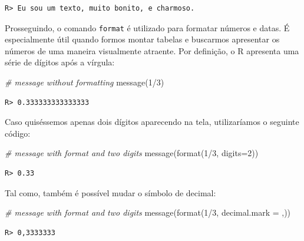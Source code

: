 \documentclass[
  11pt,
]{book}
\newenvironment{Shaded}{\begin{snugshade}}{\end{snugshade}}
\newcommand{\AttributeTok}[1]{\textcolor[rgb]{0.61,0.61,0.61}{#1}}
\newcommand{\CommentTok}[1]{\textcolor[rgb]{0.37,0.37,0.37}{\textit{#1}}}
\newcommand{\DecValTok}[1]{\textcolor[rgb]{0.06,0.06,0.06}{#1}}
\newcommand{\FunctionTok}[1]{\textcolor[rgb]{0,0,0}{#1}}
\newcommand{\NormalTok}[1]{#1}
\newcommand{\SpecialCharTok}[1]{\textcolor[rgb]{0,0,0}{#1}}
\newcommand{\StringTok}[1]{\textcolor[rgb]{0.5,0.5,0.5}{#1}}
\begin{document}
\begin{verbatim}
R> Eu sou um texto, muito bonito, e charmoso.
\end{verbatim}

Prosseguindo, o comando \texttt{format} é utilizado para formatar números e datas. É especialmente útil quando formos montar tabelas e buscarmos apresentar os números de uma maneira visualmente atraente. Por definição, o R apresenta uma série de dígitos após a vírgula:

\begin{Shaded}
\begin{Highlighting}[]
\CommentTok{\# message without formatting}
\FunctionTok{message}\NormalTok{(}\DecValTok{1}\SpecialCharTok{/}\DecValTok{3}\NormalTok{)}
\end{Highlighting}
\end{Shaded}

\begin{verbatim}
R> 0.333333333333333
\end{verbatim}

Caso quiséssemos apenas dois dígitos aparecendo na tela, utilizaríamos o seguinte código:

\begin{Shaded}
\begin{Highlighting}[]
\CommentTok{\# message with format and two digits}
\FunctionTok{message}\NormalTok{(}\FunctionTok{format}\NormalTok{(}\DecValTok{1}\SpecialCharTok{/}\DecValTok{3}\NormalTok{, }\AttributeTok{digits=}\DecValTok{2}\NormalTok{))}
\end{Highlighting}
\end{Shaded}

\begin{verbatim}
R> 0.33
\end{verbatim}

Tal como, também é possível mudar o símbolo de decimal:

\begin{Shaded}
\begin{Highlighting}[]
\CommentTok{\# message with format and two digits}
\FunctionTok{message}\NormalTok{(}\FunctionTok{format}\NormalTok{(}\DecValTok{1}\SpecialCharTok{/}\DecValTok{3}\NormalTok{, }\AttributeTok{decimal.mark =} \StringTok{\textquotesingle{},\textquotesingle{}}\NormalTok{))}
\end{Highlighting}
\end{Shaded}

\begin{verbatim}
R> 0,3333333
\end{verbatim}
\end{document}
